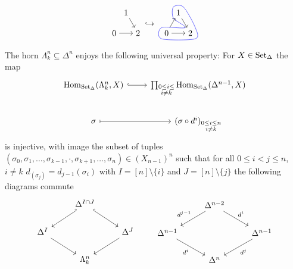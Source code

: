 \begin{exmp}
\begin{itemize}
\[\begin{tikzpicture}[baseline={(0,0.3)}]
            \node (A) at (0,0.866) {$1$};
            \node (B) at (-0.5,0) {$0$};
            \node (C) at (0.5,0) {$2$};
            \draw [->] (A) -- (C);
            \draw [->] (B) -- (C);
        \end{tikzpicture}
        \hookrightarrow
        \begin{tikzpicture}[baseline={(0,0.3)}]
            \node (A) at (0,0.866) {$1$};
            \node (B) at (-0.5,0) {$0$};
            \node (C) at (0.5,0) {$2$};
            \draw [->] (A) -- (C);
            \draw [->] (B) -- (A);
            \draw [->] (B) -- (C);
            \draw [blue] plot [smooth cycle] coordinates {(A.south west) (A.north west) (A.north east) (C.north east) (C.south east) (B.south west) (B.north west) (C.north west) };
        \end{tikzpicture}
        \]
    \end{itemize}
\end{exmp}

\begin{rmk}
    The horn $\Lambda_k^n \subseteq \Delta^n$ enjoys the following universal property:
    For $X \in \operatorname{Set}_{\Delta}$ the map 
    \[
    \begin{tikzcd}
        \Hom_{\SetD}(\Lambda_k^n,X)
        \arrow[r, hook]
        &
        \prod_{\substack{0\leq i \leq \\ i \neq k}}
        \Hom_{\SetD}(\Delta^{n-1},X)
        \\
        \sigma 
        \arrow[r, mapsto]
        &
        (\sigma \circ d^i)_{\substack{0 \leq i \leq n \\ i \neq k}}
    \end{tikzcd}
    \]
    is injective, with image the subset of tuples $(\sigma_0,\sigma_1,\dotsc,\sigma_{k-1},\cdot, \sigma_{k+1}, \dotsc, \sigma_n) \in (X_{n-1})^n$ such that for all $ 0 \leq i < j \leq n$, $i \neq k$ $d_(\sigma_j)=d_{j-1}(\sigma_i)$ with $I = [n] \setminus \{i\}$ and $J=[n]\setminus \{j\}$ the following diagrams commute
    \[
    \begin{tikzcd}
    	& {\Delta^{I \cap J}} \\
    	{\Delta^I} && {\Delta^J} \\
    	& {\Lambda_k^n}
    	\arrow[hook', from=1-2, to=2-1]
    	\arrow[hook, from=1-2, to=2-3]
    	\arrow[from=2-1, to=3-2]
    	\arrow[from=2-3, to=3-2]
    \end{tikzcd}
    \qquad
    \begin{tikzcd}
        & \Delta^{n-2} \\
        \Delta^{n-1} && \Delta^{n-1} \\
        & \Delta^n
        \arrow[from=1-2, to=2-1, "d^{j-1}"']
        \arrow[from=1-2, to=2-3, "d^{i}"]
        \arrow[from=2-1, to=3-2, "d^{i}"']
        \arrow[from=2-3, to=3-2, "d^{j}"]
    \end{tikzcd}
    \]
\end{rmk}

